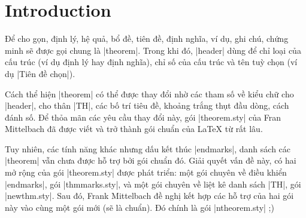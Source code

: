 \documentclass[11pt,oneside]{ltxdoc}
\theoremstyle{marginbreak}
\theoremstyle{changebreak}
\theoremstyle{change}
\theoremstyle{plain}
\theoremstyle{nonumberplain}
\begin{document}
\newpage

\tableofcontents

\section{Introduction}

Để cho gọn, định lý, hệ quả, bổ đề, tiên đề,
định nghĩa, ví dụ, ghi chú, chứng minh sẽ được gọi chung là |theorem|.
Trong khi đó, |header| dùng để chỉ loại của cấu trúc (ví dụ định lý hay
định nghĩa), chỉ số của cấu trúc và tên tuỳ chọn (ví dụ |Tiên đề chọn|).

\medskip
Cách thể hiện |theorem| có thể được thay đổi nhờ các tham số về
kiểu chữ cho |header|, cho thân |TH|, các bố trí tiêu đề, khoảng trắng
thụt đầu dòng, cách đánh số. Để thỏa mãn các yêu cầu thay đổi này,
gói |theorem.sty| của Fran Mittelbach đã được viết và trở thành
gói chuẩn của \LaTeX{} từ rất lâu.

\medskip
Tuy nhiên, các tính năng khác nhưng dấu kết thúc |endmarks|, danh sách
các |theorem| vẫn chưa được hỗ trợ bởi gói chuẩn đó. Giải quyết vấn đề này,
có hai mở rộng của gói |theorem.sty| được phát triển: một gói chuyên về
điều khiển |endmarks|, gói |thmmarks.sty|, và một gói chuyên về liệt
kê danh sách |TH|, gói |newthm.sty|. Sau đó, Frank Mittelbach đề nghị
kết hợp các hỗ trợ của hai gói này vào cùng một gói mới (sẽ là chuẩn).
Đó chính là gói |ntheorem.sty| ;)
\end{document}
